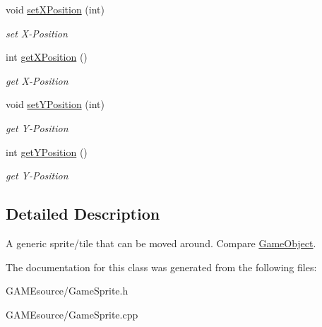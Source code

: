 \begin{DoxyCompactItemize}
\mbox{\label{class_game_sprite_adcd973ba50bc01f1a5a8e81d7e468be3}} 
void \mbox{\hyperlink{class_game_sprite_adcd973ba50bc01f1a5a8e81d7e468be3}{set\+X\+Position}} (int)
\begin{DoxyCompactList}\small\item\em set X-\/\+Position \end{DoxyCompactList}\item 
\mbox{\label{class_game_sprite_adf371cf5b8636f7cfd8cb998460f7053}} 
int \mbox{\hyperlink{class_game_sprite_adf371cf5b8636f7cfd8cb998460f7053}{get\+X\+Position}} ()
\begin{DoxyCompactList}\small\item\em get X-\/\+Position \end{DoxyCompactList}\item 
\mbox{\label{class_game_sprite_a31f481d89973565bb2d0d55d0600c266}} 
void \mbox{\hyperlink{class_game_sprite_a31f481d89973565bb2d0d55d0600c266}{set\+Y\+Position}} (int)
\begin{DoxyCompactList}\small\item\em get Y-\/\+Position \end{DoxyCompactList}\item 
\mbox{\label{class_game_sprite_aea645d5397fc4cdbd386e3133e33a802}} 
int \mbox{\hyperlink{class_game_sprite_aea645d5397fc4cdbd386e3133e33a802}{get\+Y\+Position}} ()
\begin{DoxyCompactList}\small\item\em get Y-\/\+Position \end{DoxyCompactList}\end{DoxyCompactItemize}


\subsection{Detailed Description}
A generic sprite/tile that can be moved around. Compare \mbox{\hyperlink{class_game_object}{Game\+Object}}. 

The documentation for this class was generated from the following files\+:\begin{DoxyCompactItemize}
\item 
G\+A\+M\+Esource/Game\+Sprite.\+h\item 
G\+A\+M\+Esource/Game\+Sprite.\+cpp\end{DoxyCompactItemize}
